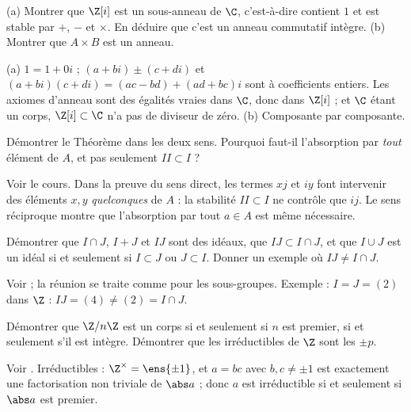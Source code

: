 \begin{exo}
(a) Montrer que $\Z[i]$ est un sous-anneau de $\C$, c'est-à-dire contient $1$ et est stable par $+$, $-$ et $\times$. En déduire que c'est un anneau commutatif intègre. (b) Montrer que $A\times B$ est un anneau.
\begin{corrige}
(a) $1=1+0i$ ; $(a+bi)\pm(c+di)$ et $(a+bi)(c+di)=(ac-bd)+(ad+bc)i$ sont à coefficients entiers. Les axiomes d'anneau sont des égalités vraies dans $\C$, donc dans $\Z[i]$ ; et $\C$ étant un corps, $\Z[i]\subset\C$ n'a pas de diviseur de zéro. (b) Composante par composante.
\end{corrige}
\end{exo}
\begin{exo}
Démontrer le Théorème  dans les deux sens. Pourquoi faut-il l'absorption par \emph{tout} élément de $A$, et pas seulement $II\subset I$ ?
\begin{corrige}
Voir le cours. Dans la preuve du sens direct, les termes $xj$ et $iy$ font intervenir des éléments $x,y$ \emph{quelconques} de $A$ : la stabilité $II\subset I$ ne contrôle que $ij$. Le sens réciproque montre que l'absorption par tout $a\in A$ est même nécessaire.
\end{corrige}
\end{exo}
\begin{exo}
Démontrer que $I\cap J$, $I+J$ et $IJ$ sont des idéaux, que $IJ\subset I\cap J$, et que $I\cup J$ est un idéal si et seulement si $I\subset J$ ou $J\subset I$. Donner un exemple où $IJ\neq I\cap J$.
\begin{corrige}
Voir  ; la réunion se traite comme pour les sous-groupes. Exemple : $I=J=(2)$ dans $\Z$ : $IJ=(4)\neq(2)=I\cap J$.
\end{corrige}
\end{exo}
\begin{exo}
Démontrer que $\Z/n\Z$ est un corps si et seulement si $n$ est premier, si et seulement s'il est intègre. Démontrer que les irréductibles de $\Z$ sont les $\pm p$.
\begin{corrige}
Voir . Irréductibles : $\Z^\times=\ens{\pm1}$, et $a=bc$ avec $b,c\neq\pm1$ est exactement une factorisation non triviale de $\abs a$ ; donc $a$ est irréductible si et seulement si $\abs a$ est premier.
\end{corrige}
\end{exo}
